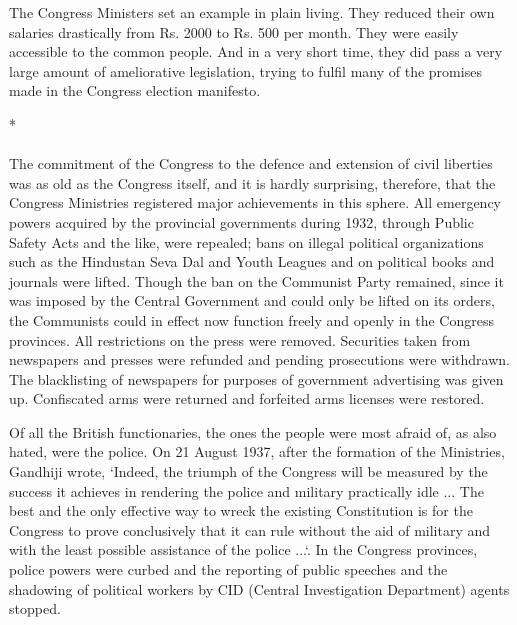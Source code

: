 \begin{multicols}{2}
The Congress Ministers set an example in plain living. They reduced their own salaries drastically from Rs. 2000 to Rs. 500 per month. They were easily accessible to the common people. And in a very short time, they did pass a very large amount of ameliorative legislation, trying to fulfil many of the promises made in the Congress election manifesto.

\begin{center}*\end{center}

\paragraph*{}
The commitment of the Congress to the defence and extension of civil liberties was as old as the Congress itself, and it is hardly surprising, therefore, that the Congress Ministries registered major achievements in this sphere. All emergency powers acquired by the provincial governments during 1932, through Public Safety Acts and the like, were repealed; bans on illegal political organizations such as the Hindustan Seva Dal and Youth Leagues and on political books and journals were lifted. Though the ban on the Communist Party remained, since it was imposed by the Central Government and could only be lifted on its orders, the Communists could in effect now function freely and openly in the Congress provinces. All restrictions on the press were removed. Securities taken from newspapers and presses were refunded and pending prosecutions were withdrawn. The blacklisting of newspapers for purposes of government advertising was given up. Confiscated arms were returned and forfeited arms licenses were restored.

Of all the British functionaries, the ones the people were most afraid of, as also hated, were the police. On 21 August 1937, after the formation of the Ministries, Gandhiji wrote, `Indeed, the triumph of the Congress will be measured by the success it achieves in rendering the police and military practically idle ... The best and the only effective way to wreck the existing Constitution is for the Congress to prove conclusively that it can rule without the aid of military and with the least possible assistance of the police ...`. In the Congress provinces, police powers were curbed and the reporting of public speeches and the shadowing of political workers by CID (Central Investigation Department) agents stopped.


\end{multicols}
